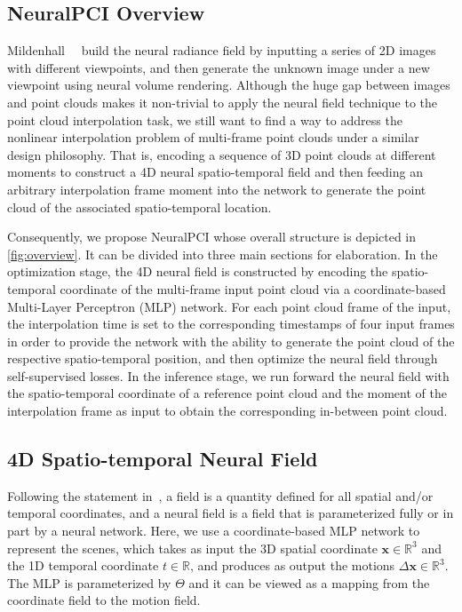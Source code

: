 \documentclass[10pt,twocolumn,letterpaper]{article}
\begin{document}
\subsection{NeuralPCI Overview}
\label{sec: overview}

Mildenhall~\etal~\cite{mildenhall2021nerf} build the neural radiance field by inputting a series of 2D images with different viewpoints, and then generate the unknown image under a new viewpoint using neural volume rendering. Although the huge gap between images and point clouds makes it non-trivial to apply the neural field technique to the point cloud interpolation task, we still want to find a way to address the nonlinear interpolation problem of multi-frame point clouds under a similar design philosophy. That is, encoding a sequence of 3D point clouds at different moments to construct a 4D neural spatio-temporal field and then feeding an arbitrary interpolation frame moment into the network to generate the point cloud of the associated spatio-temporal location. 

Consequently, we propose NeuralPCI whose overall structure is depicted in \cref{fig:overview}. It can be divided into three main sections for elaboration. In the optimization stage, the 4D neural field is constructed by encoding the spatio-temporal coordinate of the multi-frame input point cloud via a coordinate-based Multi-Layer Perceptron (MLP) network. For each point cloud frame of the input, the interpolation time is set to the corresponding timestamps of four input frames in order to provide the network with the ability to generate the point cloud of the respective spatio-temporal position, and then optimize the neural field through self-supervised losses. In the inference stage, we run forward the neural field with the spatio-temporal coordinate of a reference point cloud and the moment of the interpolation frame as input to obtain the corresponding in-between point cloud.


  
\subsection{4D Spatio-temporal Neural Field}
\label{sec: 4d spatio-temporal neural field}

Following the statement in~\cite{xie2022neural}, a field is a quantity defined for all spatial and/or temporal coordinates, and a neural field is a field that is parameterized fully or in part by a neural network.
Here, we use a coordinate-based MLP network to represent the scenes, which takes as input the 3D spatial coordinate $\mathbf{x} \in \mathbb{R}^{3}$ and the 1D temporal coordinate $t \in \mathbb{R}$, and produces as output the motions $\Delta \mathbf{x} \in \mathbb{R}^{3}$. The MLP is parameterized by $\Theta$ and it can be viewed as a mapping from the coordinate field to the motion field.
\end{document}
